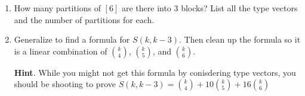 \documentclass{book}
\begin{document}
\setcounter{cpjt}{275}
\addtocounter{cpjt}{-1}
\begin{activity}\label{activity-268}
\leavevmode%
\begin{enumerate}[font=\bfseries,label=(\alph*),ref=\alph*]
\item\label{task-259} \hypertarget{p-1410}{}%
How many partitions of \([6]\) are there into 3 blocks?  List all the type vectors and the number of partitions for each.%
\item\label{task-260} \hypertarget{p-1411}{}%
Generalize to find a formula for \(S(k,k-3)\).  Then clean up the formula so it is a linear combination of \(\binom{k}{4}\), \(\binom{k}{5}\), and \(\binom{k}{6}\).%
\par\smallskip%
\noindent\textbf{Hint}.\hypertarget{hint-179}{}\quad%
\hypertarget{p-1412}{}%
While you might not get this formula by conisdering type vectors, you should be shooting to prove \(S(k, k-3) = \binom{k}{4} + 10 \binom{k}{5} + 16 \binom{k}{6}\)%
\end{enumerate}
\end{activity}

\clearpage
\end{document}
